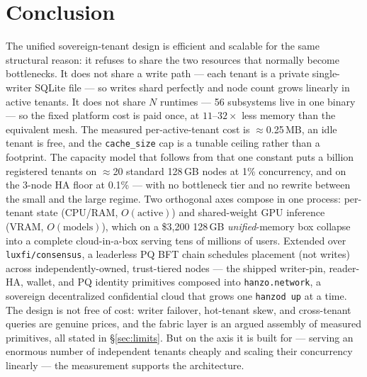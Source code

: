 \documentclass[11pt]{article}
\begin{document}
\section{Conclusion}
\label{sec:conclusion}
The unified sovereign-tenant design is efficient and scalable for the same structural reason:
it refuses to share the two resources that normally become bottlenecks. It does not share a
write path --- each tenant is a private single-writer SQLite file --- so writes shard perfectly
and node count grows linearly in active tenants. It does not share $N$ runtimes --- 56 subsystems
live in one binary --- so the fixed platform cost is paid once, at $11$--$32\times$ less memory
than the equivalent mesh. The measured per-active-tenant cost is $\approx$0.25\,MB, an idle
tenant is free, and the \texttt{cache\_size} cap is a tunable ceiling rather than a footprint.
The capacity model that follows from that one constant puts a billion registered tenants on
$\approx$20 standard 128\,GB nodes at 1\% concurrency, and on the 3-node HA floor at 0.1\% --- with
no bottleneck tier and no rewrite between the small and the large regime. Two orthogonal axes
compose in one process: per-tenant state (CPU/RAM, $O(\text{active})$) and shared-weight GPU
inference (VRAM, $O(\text{models})$), which on a \$3{,}200 128\,GB \emph{unified}-memory box
collapse into a complete cloud-in-a-box serving tens of millions of users. Extended over
\texttt{luxfi/consensus}, a leaderless PQ BFT chain schedules placement (not writes) across
independently-owned, trust-tiered nodes --- the shipped writer-pin, reader-HA, wallet, and PQ
identity primitives composed into \texttt{hanzo.network}, a sovereign decentralized confidential
cloud that grows one \texttt{hanzod up} at a time. The design is not free of cost: writer failover,
hot-tenant skew, and cross-tenant queries are genuine prices, and the fabric layer is an argued
assembly of measured primitives, all stated in \S\ref{sec:limits}. But on the axis it is built for
--- serving an enormous number of independent tenants cheaply and scaling their concurrency
linearly --- the measurement supports the architecture.

\appendix
\end{document}
